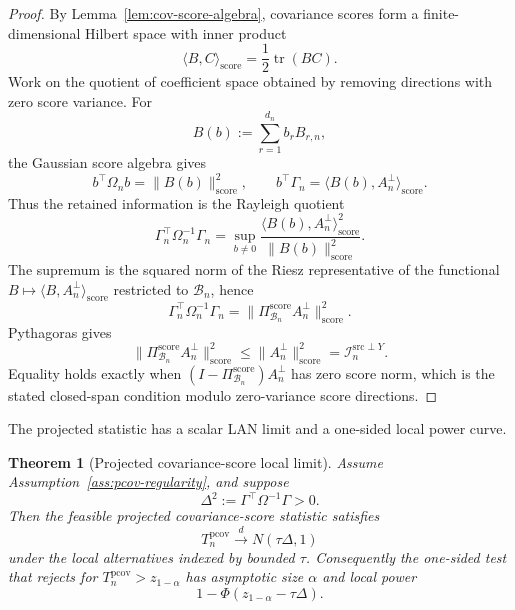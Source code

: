 \documentclass[11pt,a4paper]{amsart}
\theoremstyle{plain}
\newtheorem{theorem}{Theorem}[section]
\theoremstyle{definition}
\theoremstyle{remark}
\DeclareMathOperator{\tr}{tr}
\newcommand{\toD}{\xrightarrow{d}}
\newcommand{\scrB}{\mathcal{B}}
\newcommand{\scrI}{\mathcal{I}}
\begin{document}
\begin{proof}
By Lemma~\ref{lem:cov-score-algebra}, covariance scores form a finite-dimensional Hilbert space
with inner product
\[
        \langle B,C\rangle_{\mathrm{score}}=\frac12\tr(BC).
\]
Work on the quotient of coefficient space obtained by removing directions with zero score variance.
For
\[
        B(b):=\sum_{r=1}^{d_n} b_rB_{r,n},
\]
the Gaussian score algebra gives
\[
        b^\top\Omega_n b
        =
        \|B(b)\|_{\mathrm{score}}^2,
        \qquad
        b^\top\Gamma_n
        =
        \langle B(b),A_n^\perp\rangle_{\mathrm{score}} .
\]
Thus the retained information is the Rayleigh quotient
\[
        \Gamma_n^\top\Omega_n^{-1}\Gamma_n
        =
        \sup_{b\neq0}
        \frac{\langle B(b),A_n^\perp\rangle_{\mathrm{score}}^2}
             {\|B(b)\|_{\mathrm{score}}^2}.
\]
The supremum is the squared norm of the Riesz representative of the functional
\(B\mapsto\langle B,A_n^\perp\rangle_{\mathrm{score}}\) restricted to \(\scrB_n\), hence
\[
        \Gamma_n^\top\Omega_n^{-1}\Gamma_n
        =
        \|\Pi_{\scrB_n}^{\mathrm{score}}A_n^\perp\|_{\mathrm{score}}^2 .
\]
Pythagoras gives
\[
        \|\Pi_{\scrB_n}^{\mathrm{score}}A_n^\perp\|_{\mathrm{score}}^2
        \le
        \|A_n^\perp\|_{\mathrm{score}}^2
        =
        \scrI_n^{\mathrm{src}\perp Y}.
\]
Equality holds exactly when
\((I-\Pi_{\scrB_n}^{\mathrm{score}})A_n^\perp\) has zero score norm, which is the stated closed-span
condition modulo zero-variance score directions.
\end{proof}

The projected statistic has a scalar LAN limit and a one-sided local power curve.

\begin{theorem}[Projected covariance-score local limit]\label{thm:pcov-local-limit}
Assume Assumption~\ref{ass:pcov-regularity}, and suppose
\[
        \Delta^2:=\Gamma^\top\Omega^{-1}\Gamma>0.
\]
Then the feasible projected covariance-score statistic satisfies
\[
        T_n^{\mathrm{pcov}}
        \toD
        N(\tau\Delta,1)
\]
under the local alternatives indexed by bounded \(\tau\).  Consequently the one-sided test that
rejects for \(T_n^{\mathrm{pcov}}>z_{1-\alpha}\) has asymptotic size \(\alpha\) and local power
\[
        1-\Phi(z_{1-\alpha}-\tau\Delta).
\]
\end{theorem}
\end{document}
